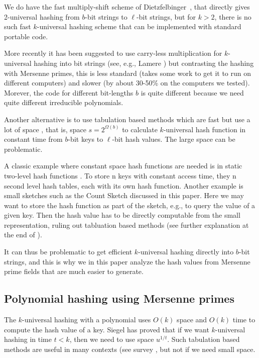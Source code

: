 We do have the fast multiply-shift scheme of Dietzfelbinger~\cite{dietzfel96universal}, that directly gives 2-universal
hashing from $b$-bit strings to $\ell$-bit strings, but for $k>2$,
there is no such fast $k$-universal hashing scheme that
can be implemented with standard portable code.

More recently it has been suggested to use carry-less multiplication
for $k$-universal hashing into bit strings (see, e.g., Lamere
\cite{Lamere14}) but contrasting the hashing with Mersenne primes,
this is less standard (takes some work to get it to run on different
computers) and slower (by about 30-50\% on the computers we tested).
Morever, the code for different bit-lengths $b$ is quite different
because we need quite different irreducible polynomials.

Another alternative is to use tabulation based methods which are fast
but use a lot of space \cite{Siegel04,Tho13:simple-simple}, that is,
space $s=2^{\Omega(b)}$ to calculate $k$-universal hash function in
constant time from $b$-bit keys to $\ell$-bit hash values. The large
space can be problematic.

A classic example where constant space hash
functions are needed is in static two-level hash functions
\cite{FKS84}.  To store n keys with constant access time, they n
second level hash tables, each with its own hash function.  Another
example is small sketches such as the Count Sketch
\cite{charikar04count-sketch} discussed in this paper. Here we may
want to store the hash function as part of the sketch, e.g., to query
the value of a given key. Then the hash value has to be directly
computable from the small representation, ruling out tabluation based
methods (see further explanation at the end of ).


It can thus be problematic to get efficient $k$-universal hashing directly into
$b$-bit strings, and this is why we in this paper analyze the
hash values from Mersenne prime fields that are much easier to generate.

\subsection{Polynomial hashing using Mersenne primes}

The $k$-universal hashing with a polynomial uses $O(k)$ space and $O(k)$ time
to compute the hash value of a key. Siegel \cite{Siegel04} has proved that if we want $k$-universal hashing in time $t<k$, then we need to use space $u^{1/t}$.
Such tabulation based methods are useful in many contexts (see survey \cite{Thorup17}, but not if we need small space.

